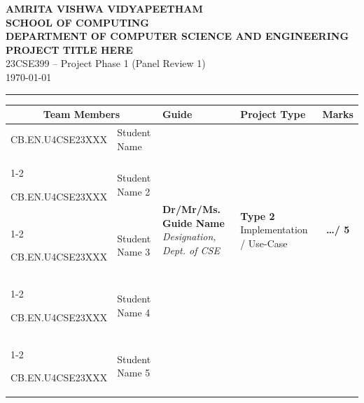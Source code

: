 \documentclass[11pt, a4paper]{article}
\begin{document}
\noindent
\begin{minipage}{\textwidth}
    \centering
    {\Large \textbf{\textcolor{amritaMaroon}{
    AMRITA VISHWA VIDYAPEETHAM \\
    SCHOOL OF COMPUTING \\
    DEPARTMENT OF COMPUTER SCIENCE AND ENGINEERING \\
    }}} 
    \vspace{0.2cm}
    {\large \textbf{PROJECT TITLE HERE}} \\
    \vspace{0.1cm}
    23CSE399 -- Project Phase 1 (Panel Review 1)\\
    \today %
\end{minipage}

\vspace{0.3cm}
\hrule
\vspace{0.3cm}

\noindent
\begin{center}
    \renewcommand{\arraystretch}{1.5}
    \setlength{\tabcolsep}{5pt}
    \begin{tabular}{|l|p{4.2cm}|p{4cm}|p{2.5cm}|c|}
        \hline
        \multicolumn{2}{|c|}{\textbf{Team Members}} & \textbf{Guide} & \textbf{Project Type} & \textbf{Marks} \\ 
        \hline
        
        \small CB.EN.U4CSE23XXX & \small \raggedright Student Name & 
        \multirow{4}{=}{\raggedright \small \textbf{Dr/Mr/Ms. Guide Name} \newline \textit{Designation, \newline Dept. of CSE}} & 
        \multirow{4}{=}{\raggedright \small \textbf{Type 2} \newline Implementation / Use-Case} & 
        \multirow{4}{*}{\textbf{\huge \dots / 5}} \\ \cline{1-2}
        
        \small CB.EN.U4CSE23XXX & \small Student Name 2 & & & \\ \cline{1-2}
        
        \small CB.EN.U4CSE23XXX & \small Student Name 3 & & & \\ \cline{1-2}
        
        \small CB.EN.U4CSE23XXX & \small Student Name 4 & & & \\ 
        \cline{1-2}
        
        \small CB.EN.U4CSE23XXX & \small Student Name 5 & & & \\ 
        \hline
    \end{tabular}
\end{center}
\vspace{0.2cm}
\end{document}
